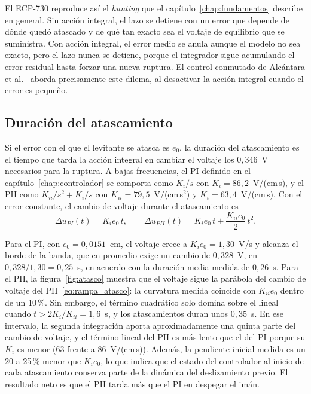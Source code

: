 El ECP-730 reproduce así el \emph{hunting} que el capítulo~\ref{chap:fundamentos} describe en general. Sin acción integral, el lazo se detiene con un error que depende de dónde quedó atascado y de qué tan exacto sea el voltaje de equilibrio que se suministra. Con acción integral, el error medio se anula aunque el modelo no sea exacto, pero el lazo nunca se detiene, porque el integrador sigue acumulando el error residual hasta forzar una nueva ruptura. El control conmutado de Alcántara et al.~\cite{alcantara} aborda precisamente este dilema, al desactivar la acción integral cuando el error es pequeño.

\subsection{Duración del atascamiento}

Si el error con el que el levitante se atasca es $e_0$, la duración del atascamiento es el tiempo que tarda la acción integral en cambiar el voltaje los $0{,}346$~V necesarios para la ruptura. A bajas frecuencias, el PI definido en el capítulo~\ref{chap:controlador} se comporta como $K_i/s$ con $K_i=86{,}2$~V/(cm\,s), y el PII como $K_{ii}/s^2 + K_i/s$ con $K_{ii}=79{,}5$~V/(cm\,s$^2$) y $K_i=63{,}4$~V/(cm\,s). Con el error constante, el cambio de voltaje durante el atascamiento es
\begin{equation}
\Delta u_{PI}(t) = K_i e_0\, t, \qquad
\Delta u_{PII}(t) = K_i e_0\, t + \frac{K_{ii} e_0}{2}\, t^2 .
\label{eq:rampa_atasco}
\end{equation}

Para el PI, con $e_0=0{,}0151$~cm, el voltaje crece a $K_i e_0 = 1{,}30$~V/s y alcanza el borde de la banda, que en promedio exige un cambio de $0{,}328$~V, en $0{,}328/1{,}30=0{,}25$~s, en acuerdo con la duración media medida de $0{,}26$~s. Para el PII, la figura~\ref{fig:atasco} muestra que el voltaje sigue la parábola del cambio de voltaje del PII~\eqref{eq:rampa_atasco}: la curvatura medida coincide con $K_{ii}e_0$ dentro de un 10\,\%. Sin embargo, el término cuadrático solo domina sobre el lineal cuando $t > 2K_i/K_{ii} = 1{,}6$~s, y los atascamientos duran unos $0{,}35$~s. En ese intervalo, la segunda integración aporta aproximadamente una quinta parte del cambio de voltaje, y el término lineal del PII es más lento que el del PI porque su $K_i$ es menor (63 frente a 86~V/(cm\,s)). Además, la pendiente inicial medida es un 20 a 25\,\% menor que $K_i e_0$, lo que indica que el estado del controlador al inicio de cada atascamiento conserva parte de la dinámica del deslizamiento previo. El resultado neto es que el PII tarda más que el PI en despegar el imán.

